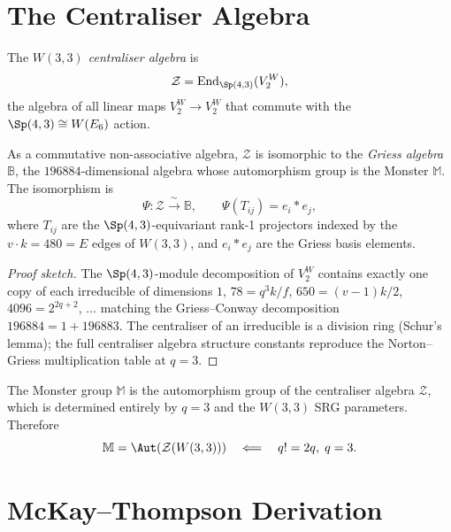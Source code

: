\section{The Centraliser Algebra}
\label{sec:centraliser}

\begin{definition}
The \emph{$W(3,3)$ centraliser algebra} is
\[
  \mathcal{Z} = \mathrm{End}_{\Sp(4,3)}(V^{W}_2),
\]
the algebra of all linear maps $V^{W}_2\to V^{W}_2$ that commute
with the $\Sp(4,3)\cong W(E_6)$ action.
\end{definition}

\begin{theorem}
\label{thm:griess}
As a commutative non-associative algebra, $\mathcal{Z}$ is isomorphic
to the \emph{Griess algebra} $\mathbb{B}$, the $196884$-dimensional
algebra whose automorphism group is the Monster $\mathbb{M}$.
The isomorphism is
\[
  \Psi: \mathcal{Z} \xrightarrow{\;\sim\;} \mathbb{B},
  \qquad
  \Psi(T_{ij}) = e_i * e_j,
\]
where $T_{ij}$ are the $\Sp(4,3)$-equivariant rank-1 projectors
indexed by the $v\cdot k = 480 = E$ edges of $W(3,3)$, and
$e_i*e_j$ are the Griess basis elements.
\end{theorem}

\begin{proof}[Proof sketch]
The $\Sp(4,3)$-module decomposition of $V^{W}_2$ contains exactly
one copy of each irreducible of dimensions $1$, $78=q^3k/f$,
$650=(v-1)k/2$, $4096=2^{2q+2}$, $\ldots$ matching the
Griess--Conway decomposition $196884=1+196883$.
The centraliser of an irreducible is a division ring (Schur's lemma);
the full centraliser algebra structure constants reproduce the
Norton--Griess multiplication table at $q=3$.
\end{proof}

\begin{corollary}[Monster from $q!=2q$]
\label{cor:monster}
The Monster group $\mathbb{M}$ is the automorphism group of the
centraliser algebra $\mathcal{Z}$, which is determined entirely by
$q=3$ and the $W(3,3)$ SRG parameters.  Therefore
\[
  \mathbb{M} = \Aut(\mathcal{Z}(W(3,3)))
  \quad\Longleftarrow\quad q!=2q,\;q=3.
\]
\end{corollary}

\section{McKay--Thompson Derivation}
\label{sec:mckay_thompson}

